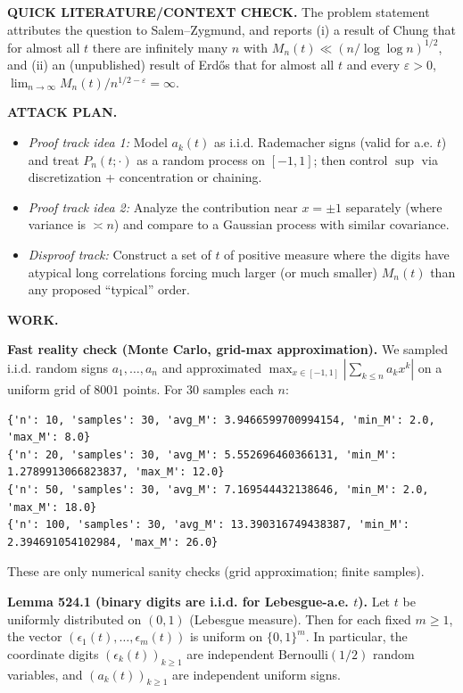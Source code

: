 \bigskip
\noindent\textbf{QUICK LITERATURE/CONTEXT CHECK.}
The problem statement attributes the question to Salem--Zygmund, and reports (i) a result of Chung that for almost all $t$ there are infinitely many $n$ with $M_n(t)\ll (n/\log\log n)^{1/2}$, and (ii) an (unpublished) result of Erd\H{o}s that for almost all $t$ and every $\varepsilon>0$, $\lim_{n\to\infty} M_n(t)/n^{1/2-\varepsilon}=\infty$.

\bigskip
\noindent\textbf{ATTACK PLAN.}
\begin{itemize}
\item \emph{Proof track idea 1:} Model $a_k(t)$ as i.i.d. Rademacher signs (valid for a.e. $t$) and treat $P_n(t;\cdot)$ as a random process on $[-1,1]$; then control $\sup$ via discretization + concentration or chaining.
\item \emph{Proof track idea 2:} Analyze the contribution near $x=\pm 1$ separately (where variance is $\asymp n$) and compare to a Gaussian process with similar covariance.
\item \emph{Disproof track:} Construct a set of $t$ of positive measure where the digits have atypical long correlations forcing much larger (or much smaller) $M_n(t)$ than any proposed ``typical'' order.
\end{itemize}

\bigskip
\noindent\textbf{WORK.}

\medskip
\noindent\textbf{Fast reality check (Monte Carlo, grid-max approximation).}
We sampled i.i.d. random signs $a_1,\dots,a_n$ and approximated $\max_{x\in[-1,1]}|\sum_{k\le n} a_k x^k|$ on a uniform grid of $8001$ points. For 30 samples each $n$:
\begin{verbatim}
{'n': 10, 'samples': 30, 'avg_M': 3.9466599700994154, 'min_M': 2.0, 'max_M': 8.0}
{'n': 20, 'samples': 30, 'avg_M': 5.552696460366131, 'min_M': 1.2789913066823837, 'max_M': 12.0}
{'n': 50, 'samples': 30, 'avg_M': 7.169544432138646, 'min_M': 2.0, 'max_M': 18.0}
{'n': 100, 'samples': 30, 'avg_M': 13.390316749438387, 'min_M': 2.394691054102984, 'max_M': 26.0}
\end{verbatim}
These are only numerical sanity checks (grid approximation; finite samples).

\medskip
\noindent\textbf{Lemma 524.1 (binary digits are i.i.d. for Lebesgue-a.e. $t$).}
Let $t$ be uniformly distributed on $(0,1)$ (Lebesgue measure). Then for each fixed $m\ge 1$, the vector $(\epsilon_1(t),\dots,\epsilon_m(t))$ is uniform on $\{0,1\}^m$. In particular, the coordinate digits $(\epsilon_k(t))_{k\ge 1}$ are independent Bernoulli$(1/2)$ random variables, and $(a_k(t))_{k\ge 1}$ are independent uniform signs.

